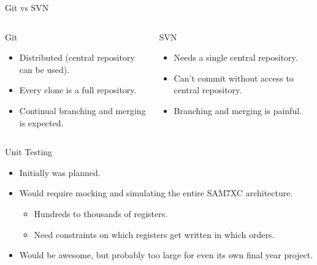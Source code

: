 \documentclass[xcolor=dvipsnames]{beamer}
\begin{document}
    \begin{frame}{Git vs SVN}
      \begin{columns}
          \begin{block}{Git}
            \begin{itemize}
              \item Distributed (central repository can be used).
              \vspace{0.5\baselineskip}
              \item Every clone is a full repository.
              \vspace{0.5\baselineskip}
              \item Continual branching and merging is expected.
            \end{itemize}
          \end{block}

          \begin{block}{SVN}
            \begin{itemize}
              \item Needs a single central repository.
              \vspace{0.5\baselineskip}
              \item Can't commit without access to central repository.
              \vspace{0.5\baselineskip}
              \item Branching and merging is painful.
            \end{itemize}
          \end{block}
      \end{columns}
    \end{frame}

    \begin{frame}{Unit Testing}
      \begin{itemize}
        \item Initially was planned.
        \vspace{0.5\baselineskip}
        \item Would require mocking and simulating the entire SAM7XC architecture.
        \begin{itemize}
          \item Hundreds to thousands of registers.
          \item Need constraints on which registers get written in which orders.
        \end{itemize}
        \vspace{0.5\baselineskip}
        \item Would be awesome, but probably too large for even its own final year project.
      \end{itemize}
    \end{frame}
\end{document}

